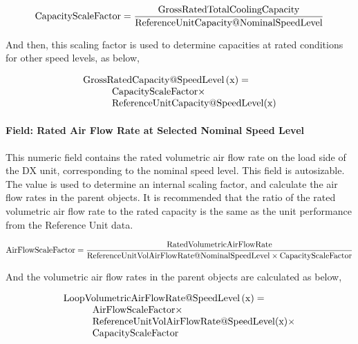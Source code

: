 \begin{equation}
{\rm{CapacityScaleFactor}} = \frac{{{\rm{Gross RatedTotalCoolingCapacity}}}}{{{\rm{ReferenceUnitCapacity}}@{\rm{NominalSpeedLevel}}}}
\end{equation}

And then, this scaling factor is used to determine capacities at rated conditions for other speed levels, as below,

\begin{equation}
  \begin{array}{l}
    \rm{Gross RatedCapacity} @ \rm{SpeedLevel} \left( {\rm{x}} \right) = \\
    \quad \quad \quad \rm{CapacityScaleFactor} \times \\
    \quad \quad \quad \rm{ReferenceUnitCapacity} @ {\rm{SpeedLevel}}(\rm{x})
  \end{array}
\end{equation}

\paragraph{Field: Rated Air Flow Rate at Selected Nominal Speed Level}\label{field-rated-air-flow-rate-at-selected-nominal-speed-level}

This numeric field contains the rated volumetric air flow rate on the load side of the DX unit, corresponding to the nominal speed level. This field is autosizable. The value is used to determine an internal scaling factor, and calculate the air flow rates in the parent objects. It is recommended that the ratio of the rated volumetric air flow rate to the rated capacity is the same as the unit performance from the Reference Unit data.

\begin{equation}
\rm{AirFlowScaleFactor} = \frac{\rm{RatedVolumetricAirFlowRate}}{\rm{ReferenceUnitVolAirFlowRate} @ \rm{NominalSpeedLevel} \times \rm{CapacityScaleFactor}}
\end{equation}

And the volumetric air flow rates in the parent objects are calculated as below,

\begin{equation}
  \begin{array}{l}
    \rm{LoopVolumetricAirFlowRate} @ \rm{SpeedLevel} \left( \rm{x} \right) = \\
    \quad \quad \quad \rm{AirFlowScaleFactor} \times \\
    \quad \quad \quad \rm{ReferenceUnitVolAirFlowRate} @ \rm{SpeedLevel}(\rm{x}) \times \\
    \quad \quad \quad \rm{CapacityScaleFactor}
  \end{array}
\end{equation}

